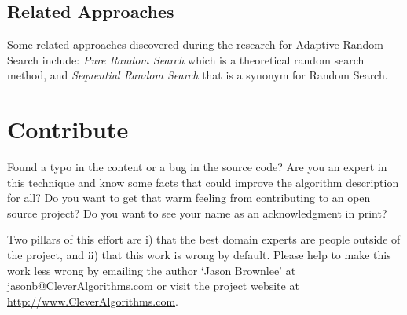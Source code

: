 \documentclass[a4paper, 11pt]{article}
\makeatletter
\newcommand{\myreportauthor}{Jason Brownlee}
\newcommand{\myreportemail}{jasonb@CleverAlgorithms.com}
\newcommand{\myreportwebsite}{http://www.CleverAlgorithms.com}
\makeatother
\begin{document}
\subsection{Related Approaches}
Some related approaches discovered during the research for Adaptive Random Search include: \emph{Pure Random Search} \cite{Patell1989} which is a theoretical random search method, and \emph{Sequential Random Search} that is a synonym for Random Search.

% 
% 
\section{Contribute}
\label{sec:contribute}
Found a typo in the content or a bug in the source code? 
Are you an expert in this technique and know some facts that could improve the algorithm description for all?
Do you want to get that warm feeling from contributing to an open source project? 
Do you want to see your name as an acknowledgment in print?

Two pillars of this effort are i) that the best domain experts are people outside of the project, and ii) that this work is wrong by default. 
Please help to make this work less wrong by emailing the author `\myreportauthor' at \url{\myreportemail} or visit the project website at \url{\myreportwebsite}.



\end{document}
